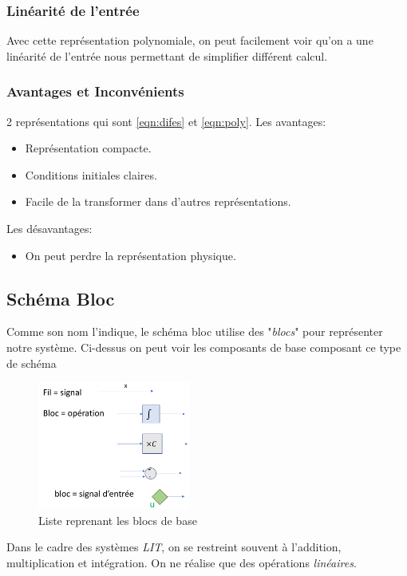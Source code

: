 \documentclass{report}
\begin{document}
\subsubsection{Linéarité de l'entrée}
Avec cette représentation polynomiale, on peut facilement voir qu'on a une linéarité de l'entrée nous permettant de simplifier différent calcul. %

\subsubsection{Avantages et Inconvénients}
2 représentations qui sont \ref{eqn:difes} et \ref{eqn:poly}. Les avantages:
\begin{itemize}
\item Représentation compacte.
\item Conditions initiales claires.
\item Facile de la transformer dans d'autres représentations.
\end{itemize}
Les désavantages:
\begin{itemize}
\item On peut perdre la représentation physique.
\end{itemize}

\subsection{Schéma Bloc}
Comme son nom l'indique, le schéma bloc utilise des "\textit{blocs}" pour représenter notre système. Ci-dessus on peut voir les composants de base composant ce type de schéma
\begin{figure}[H]
\centering
\includegraphics[width=5cm]{img/blocExemple.png}
\caption{Liste reprenant les blocs de base}
\end{figure}
Dans le cadre des systèmes \textit{LIT}, on se restreint souvent à l'addition, multiplication et intégration. On ne réalise que des opérations \textit{linéaires}.
\end{document}
